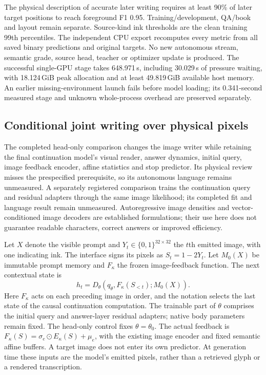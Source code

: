 \documentclass[12pt,a4paper]{article}
\providecommand{\DIFadd}[1]{{\protect\color{blue} \sf #1}} %
\begin{document}
\DIFadd{The physical description of accurate later writing requires at least 90\% of
later target positions to reach foreground F1 0.95. Training/development,
QA/book and layout remain separate. Source-kind ink thresholds are the clean
training 99th percentiles. The independent CPU export recomputes every metric
from all saved binary predictions and original targets. No new autonomous
stream, semantic grade, source head, teacher or optimizer update is produced.
The successful single-GPU stage takes 648.971\,s, including 30.029\,s of
pressure waiting, with 18.124\,GiB peak allocation and at least 49.819\,GiB
available host memory. An earlier missing-environment launch fails before
model loading; its 0.341-second measured stage and unknown whole-process
overhead are preserved separately.
}

\subsection*{\DIFadd{Conditional joint writing over physical pixels}}
\DIFadd{The completed head-only comparison changes the image writer while retaining the final
continuation model's visual reader, answer dynamics, initial query, image
feedback encoder, affine statistics and stop predictor. Its physical review
misses the prespecified prerequisite, so its autonomous language remains
unmeasured. A separately registered comparison trains the continuation query
and residual adapters through the same image likelihood; its completed fit
and language result remain unmeasured. Autoregressive image
densities and vector-conditioned image decoders are established
formulations\cite{pixelrnn,pixelcnn}; their use here does not guarantee readable
characters, correct answers or improved efficiency.
}

\DIFadd{Let $X$ denote the visible prompt and $Y_t\in\{0,1\}^{32\times32}$ the $t$th
emitted image, with one indicating ink. The interface signs its pixels as
$S_t=1-2Y_t$. Let $M_0(X)$ be immutable prompt memory and $F_\kappa$ the frozen
image-feedback function. The next contextual state is
}\begin{equation}
 h_t=D_\theta\!\left(q_\theta,F_\kappa(S_{<t});M_0(X)\right).
 \label{eq:joint-glyph-history}
\end{equation}
\DIFadd{Here $F_\kappa$ acts on each preceding image in order, and the notation selects
the last state of the causal continuation computation. The trainable part of
$\theta$ comprises the initial query and answer-layer residual adapters; native
body parameters remain fixed. The head-only control fixes $\theta=\theta_0$.
The actual feedback is
$F_\kappa(S)=\sigma_e\odot E_\kappa(S)+\mu_e$, with the existing image encoder
and fixed semantic affine buffers. A target image does not enter its own
predictor. At generation time these inputs are the model's
emitted pixels, rather than a retrieved glyph or a rendered transcription.
}
\end{document}
